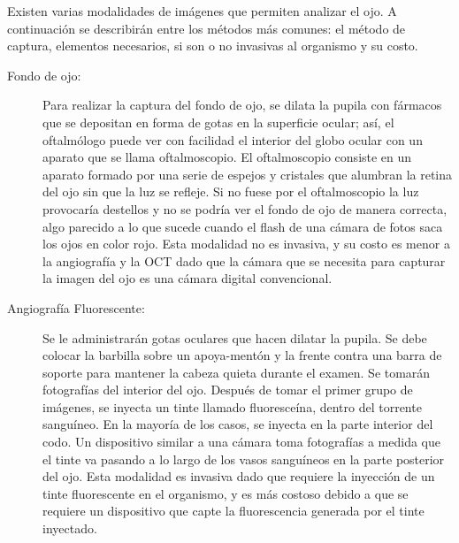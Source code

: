 Existen varias modalidades de imágenes que permiten analizar el ojo. A continuación se describirán entre los métodos más comunes: el método de captura, elementos necesarios, si son o no invasivas al organismo y su costo.
\begin{description}
\item[Fondo de ojo:] Para realizar la captura del fondo de ojo, se dilata la pupila con fármacos que se depositan en forma de gotas en la superficie ocular; así, el oftalmólogo puede ver con facilidad el interior del globo ocular con un aparato que se llama oftalmoscopio. El oftalmoscopio consiste en un aparato formado por una serie de espejos y cristales que alumbran la retina del ojo sin que la luz se refleje. Si no fuese por el oftalmoscopio la luz provocaría destellos y no se podría ver el fondo de ojo de manera correcta, algo parecido a lo que sucede cuando el flash de una cámara de fotos saca los ojos en color rojo. Esta modalidad no es invasiva, y su costo es menor a la angiografía y la OCT dado que la cámara que se necesita para capturar la imagen del ojo es una cámara digital convencional.

\item[Angiografía Fluorescente:] Se le administrarán gotas oculares que hacen dilatar la pupila. Se debe colocar la barbilla sobre un apoya-mentón y la frente contra una barra de soporte para mantener la cabeza quieta durante el examen. Se tomarán fotografías del interior del ojo. Después de tomar el primer grupo de imágenes, se inyecta un tinte llamado fluoresceína, dentro del  torrente sanguíneo. En la mayoría de los casos, se inyecta en la parte interior del codo. Un dispositivo similar a una cámara toma fotografías a medida que el tinte va pasando a lo largo de los vasos sanguíneos en la parte posterior del ojo. Esta modalidad es invasiva dado que requiere la inyección de  un tinte fluorescente en el organismo, y es más costoso debido a que se requiere un dispositivo que capte la fluorescencia generada por el tinte inyectado.


\end{description}
